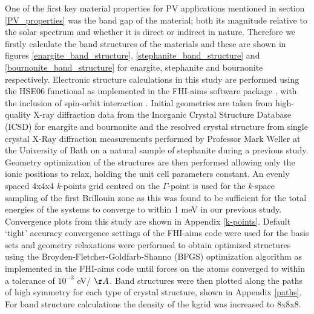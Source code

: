 One of the first key material properties for PV applications mentioned in section \ref{PV_properties} was the band gap of the material; both its magnitude relative to the solar spectrum and whether it is direct or indirect in nature. Therefore we firstly calculate the band structures of the materials and these are shown in figures \ref{enargite_band_structure}, \ref{stephanite_band_structure} and \ref{bournonite_band_structure} for enargite, stephanite and bournonite respectively.
Electronic structure calculations in this study are performed using the HSE06 functional \cite{HSE} as implemented in the FHI-aims software package \cite{aims, aims_hybrids, aims_parallel}, with the inclusion of spin-orbit interaction \cite{aims_SOC}.
Initial geometries are taken from high-quality X-ray diffraction data from the Inorganic Crystal Structure Database (ICSD)\cite{icsd} for enargite and bournonite and the resolved crystal structure from single crystal X-Ray diffraction measurements performed by Professor Mark Weller at the University of Bath on a natural sample of stephanite during a previous study. Geometry optimization of the structures are then performed allowing only the ionic positions to relax, holding the unit cell parameters constant.
An evenly spaced 4x4x4 \textit{k}-points grid centred on the $\Gamma$-point is used for the \textit{k}-space sampling of the first Brillouin zone as this was found to be sufficient for the total energies of the systems to converge to within 1 meV in our previous study. Convergence plots from this study are shown in Appendix \ref{k-points}.
Default `tight' accuracy convergence settings of the FHI-aims code were used for the basis sets and geometry relaxations were performed to obtain optimized structures using the Broyden-Fletcher-Goldfarb-Shanno (BFGS) optimization algorithm as implemented in the FHI-aims code \cite{aims} until forces on the atoms converged to within a tolerance of $10^{-3}$ eV/ $\AA$. Band structures were then plotted along the paths of high symmetry for each type of crystal structure, shown in Appendix \ref{paths}. For band structure calculations the density of the kgrid was increased to 8x8x8.

